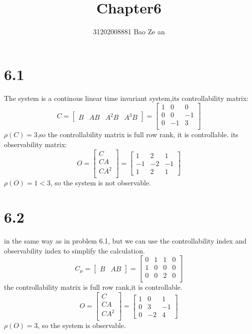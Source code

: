 \documentclass{article}
\title{Chapter6}
\author{31202008881        \quad \quad \quad
          Bao Ze an}
\begin{document}
\setlength{\parindent}{2em}
\maketitle
\section*{6.1}
The system is a continous linear time invariant system,its controllability matrix:
\[
C=
\left[
\begin{array}{cccc}
B & AB & A^2B &A^3B
\end{array}
\right]   
=
\left[
    \begin{array}{ccc}
    1 & 0 & 0\\
    0 & 0 & -1\\
    0 & -1 & 3\\
    \end{array}
\right]
\]
$\rho(C)=3$,so the controllability matrix is full row rank, it is controllable.
its observability matrix:\\
\[
O=\left[
    \begin{array}{c}
        C\\
        CA\\
        CA^2\\
    \end{array}
\right]
=\left[
    \begin{array}{ccc}
    1 & 2 & 1\\
    -1 & -2 & -1\\
    1 & 2 & 1
    \end{array}
\right]   
\]
$\rho(O)=1 <3$, so the system is not observable.

\section*{6.2}
in the same way as in problem 6.1, but we can use the controllability index and observability index to 
simplify the calculation.
\[
C_\mu=
\left[
\begin{array}{cc}
B & AB
\end{array}
\right]   
=
\left[
    \begin{array}{cccc}
    0 & 1 & 1 & 0\\
    1 & 0 & 0 & 0\\
    0 & 0 & 2 & 0\\
    \end{array}
\right]
\]
the controllability matrix is full row rank,it is controllable.
\[
O=\left[
    \begin{array}{c}
        C\\
        CA\\
        CA^2\\
    \end{array}
\right]
=\left[
    \begin{array}{ccc}
    1 & 0 & 1\\
    0 & 3 & -1\\
    0 & -2 & 4
    \end{array}
\right]   
\]
$\rho(O)=3$, so the system is observable.
\end{document}
